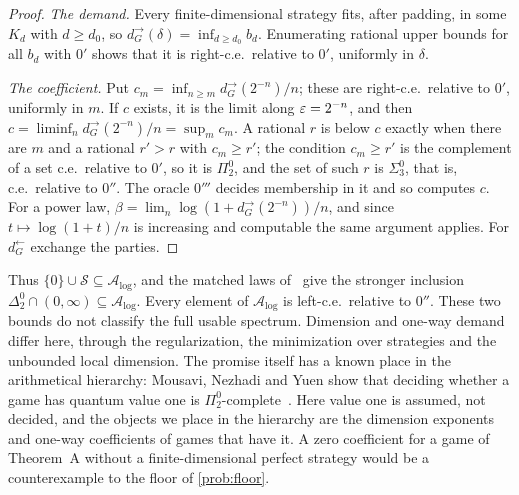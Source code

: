 \begin{proof}
\emph{The demand.} Every finite-dimensional strategy fits, after padding, in some $K_d$ with $d\ge d_0$, so
$d^\to_G(\delta)=\inf_{d\ge d_0}b_d$. Enumerating rational upper bounds for all $b_d$ with $0'$ shows that it is right-c.e.\ relative to $0'$,
uniformly in $\delta$.

\emph{The coefficient.} Put $c_m=\inf_{n\ge m}d^\to_G(2^{-n})/n$; these are right-c.e.\ relative to $0'$, uniformly in $m$. If $c$ exists, it is
the limit along $\varepsilon=2^{-n}$, and then $c=\liminf_n d^\to_G(2^{-n})/n=\sup_mc_m$. A rational $r$ is below $c$ exactly when there are $m$ and a
rational $r'>r$ with $c_m\ge r'$; the condition $c_m\ge r'$ is the complement of a set c.e.\ relative to $0'$, so it is $\Pi^0_2$, and the set
of such $r$ is $\Sigma^0_3$, that is, c.e.\ relative to $0''$. The oracle $0'''$ decides membership in it and so computes $c$. For a power law,
$\beta=\lim_n\log(1+d^\to_G(2^{-n}))/n$, and since $t\mapsto\log(1+t)/n$ is increasing and computable the same argument applies. For
$d^\leftarrow_G$ exchange the parties.
\end{proof}

Thus $\{0\}\cup\mathcal S\subseteq\mathcal A_{\log}$, and the matched laws of~\cite[Theorem~16.6 and Corollary~16.7]{DM-U3} give the stronger inclusion
$\Delta^0_2\cap(0,\infty)\subseteq\mathcal A_{\log}$. Every element of $\mathcal A_{\log}$ is left-c.e.\ relative to $0''$.
These two bounds do not classify the full usable spectrum. Dimension and one-way demand differ here, through the regularization, the minimization over strategies and the unbounded
local dimension. The promise itself has a known place in the arithmetical hierarchy: Mousavi, Nezhadi and Yuen show that deciding
whether a game has quantum value one is $\Pi^0_2$-complete~\cite[Theorem~1.1]{MNY22}. Here value one is assumed, not decided, and the
objects we place in the hierarchy are the dimension exponents and one-way coefficients of games that have it. A zero coefficient
for a game of Theorem~A without a finite-dimensional perfect strategy would be a counterexample to the floor of \cref{prob:floor}.



